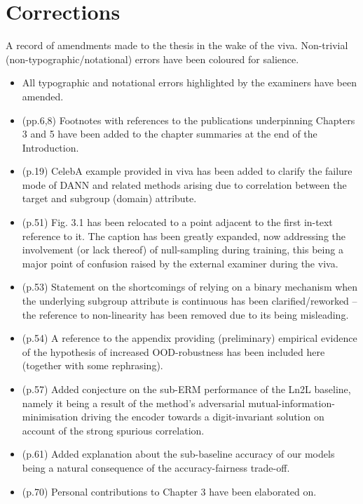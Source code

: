 \section*{Corrections}
%
A record of amendments made to the thesis in the wake of the viva.
%
Non-trivial (non-typographic/notational) errors have been coloured  for salience.
%
\begin{itemize}
    \item All typographic and notational errors highlighted by the examiners have been amended.
    \item (pp.6,8) Footnotes with references to the publications underpinning Chapters 3 and 5 have
        been added to the chapter summaries at the end of the Introduction.
    \item (p.19) CelebA example provided in viva has been added to clarify the failure mode of DANN
        and related methods arising due to correlation between the target and subgroup (domain)
        attribute.
    \item (p.51) Fig. 3.1 has been relocated to a point adjacent to the first in-text reference to
        it. 
        The caption has been greatly expanded, now addressing the involvement (or lack thereof) of
        null-sampling during training, this being a major point of confusion raised by the external
        examiner during the viva.
    \item (p.53) Statement on the shortcomings of relying on a binary mechanism when the underlying
        subgroup attribute is continuous has been clarified/reworked -- the reference to
        non-linearity has been removed due to its being misleading.
    \item (p.54) A reference to the appendix providing (preliminary) empirical evidence of the
        hypothesis of increased OOD-robustness has been included here (together with some
        rephrasing).
    \item (p.57) Added conjecture on the sub-ERM performance of the Ln2L baseline, namely it being
        a result of the method's adversarial mutual-information-minimisation driving the encoder
        towards a digit-invariant solution on account of the strong spurious correlation.
    \item (p.61) Added explanation about the sub-baseline accuracy of our models being a natural
        consequence of the accuracy-fairness trade-off.
    \item (p.70) Personal contributions to Chapter 3 have been elaborated on.

\end{itemize}

